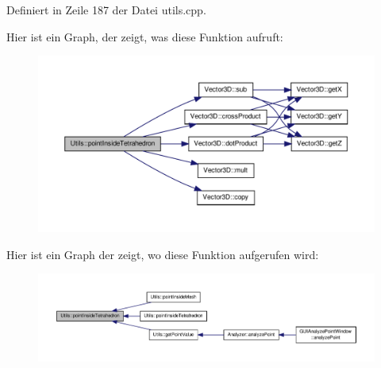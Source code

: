Definiert in Zeile 187 der Datei utils.\-cpp.



Hier ist ein Graph, der zeigt, was diese Funktion aufruft\-:
\nopagebreak
\begin{figure}[H]
\begin{center}
\leavevmode
\includegraphics[width=350pt]{namespaceUtils_a9b995a1220a78be108b19bda4b776332_cgraph}
\end{center}
\end{figure}




Hier ist ein Graph der zeigt, wo diese Funktion aufgerufen wird\-:
\nopagebreak
\begin{figure}[H]
\begin{center}
\leavevmode
\includegraphics[width=350pt]{namespaceUtils_a9b995a1220a78be108b19bda4b776332_icgraph}
\end{center}
\end{figure}


